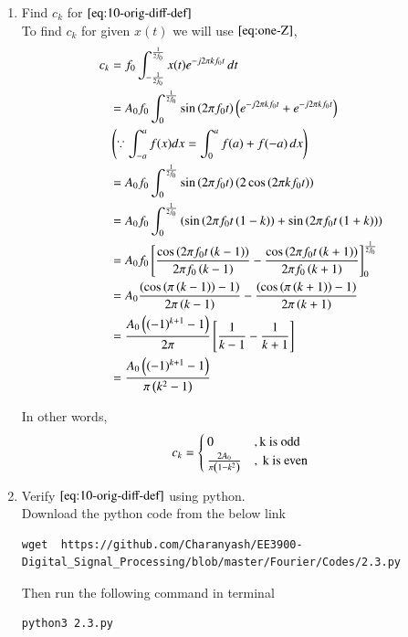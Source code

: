 \documentclass[journal,12pt,twocolumn]{IEEEtran}
\renewcommand\thesection{\arabic{section}}
\begin{document}
\begin{enumerate}[label=\thesection.\arabic*,ref=\thesection.\theenumi]
	\item Find $c_k$ for 
	$\eqref{eq:10-orig-diff-def}$ \\
	\solution To find $c_k$ for given $x(t)$ we will use $\eqref{eq:one-Z}$,
	  \begin{align}
		  c_k &= f_0\int_{-\frac{1}{2f_0}}^{\frac{1}{2f_0}}x(t)e^{-j2\pi kf_0 t}\, dt \\
		      &= A_0f_0\int_{0}^{\frac{1}{2f_0}}\sin\left(2\pi f_0t\right)\left(e^{-j2\pi kf_0t} + e^{-j2\pi kf_0t}\right) \\
		      & \left(\because \int_{-a}^{a} f(x)dx = \int_{0}^{a}f(a) + f(-a)\,dx\right)\nonumber \\
		      &= A_0f_0\int_{0}^{\frac{1}{2f_0}}\sin\left(2\pi f_0 t\right)\left(2\cos\left(2\pi k f_0t\right)\right) \\
		      &= A_0f_0\int_{0}^{\frac{1}{2f_0}}\left(\sin\left(2\pi f_0t\left(1-k\right)\right) + \sin\left(2\pi f_0t\left(1 + k\right)\right)\right) \\
		      &= A_0f_0{}\left[\frac{\cos\left(2\pi f_0t\left(k -1\right)\right)}{2 \pi f_0\left(k-1\right)} - \frac{\cos\left(2\pi f_0t\left(k+1\right)\right)}{2 \pi f_0\left(k+1\right)}\right]_{0}^{\frac{1}{2f_0}}\\
		      &= A_0\frac{\left(\cos\left(\pi \left(k-1\right)\right) - 1\right)}{2\pi \left(k-1\right)} - \frac{\left(\cos\left(\pi \left(k+1\right)\right) -1\right)}{2\pi \left(k+1\right)}\\
		      &= \frac{A_0\left((-1)^{k+1} -1\right)}{2\pi}{}\left[\frac{1}{k-1} - \frac{1}{k+1}\right] \\
		      &= \frac{A_0\left((-1)^{k+1} - 1\right)}{\pi\left(k^{2} -1\right)}
	  \end{align}

  In other words,
     \begin{align}
	     c_k = \begin{cases}
		         0 &, \text{k is odd} \\
			 \frac{2A_0}{\pi\left(1 - k^2\right)} &, \text{ k is even}
		 \end{cases}\label{eq:c_k}
     \end{align}
\item Verify 
	$\eqref{eq:10-orig-diff-def}$
	using python.\\
\solution Download the python code from the below link
   \begin{lstlisting}
wget  https://github.com/Charanyash/EE3900-Digital_Signal_Processing/blob/master/Fourier/Codes/2.3.py
\end{lstlisting}
Then run the following command in terminal
 \begin{lstlisting}
python3 2.3.py
\end{lstlisting}


\end{enumerate}
\end{document}
